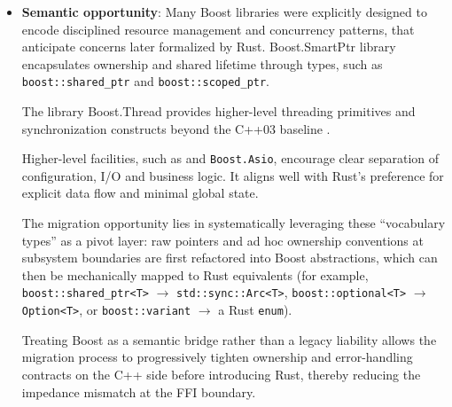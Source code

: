 \begin{itemize}
\begin{lstlisting}[language=C++]
        class AsyncEngine {
        public:
            AsyncEngine() : timer_(io_, boost::asio::chrono::milliseconds(500)) {}

            // PROBLEM: This method uses a C++ Template for the handler (Lambda).
            // Bindgen ignores this because it requires template instantiation.
            // It relies on SFINAE to check if the handler has the right signature.
            template <typename CompletionToken>
            void start_task(CompletionToken&& token) {
                timer_.async_wait(token);
                io_.run();
            }

        private:
            boost::asio::io_context io_;
            boost::asio::steady_timer timer_;
        };
    \end{lstlisting}

    \item \textbf{Semantic opportunity}: Many Boost libraries were explicitly designed to encode disciplined 
    resource management 
    and concurrency patterns, that anticipate concerns later formalized by Rust. 
    Boost.SmartPtr library encapsulates ownership and shared lifetime through types, such as 
    \texttt{boost::shared\_ptr} and \texttt{boost::scoped\_ptr}. 
    
    The library Boost.Thread provides higher-level threading primitives 
    and synchronization constructs beyond the C++03 baseline \parencite{boost_docs}. 

    Higher-level facilities, such as  and \texttt{Boost.Asio}, 
    encourage clear separation of configuration, I/O and business logic. 
    It aligns well with Rust's preference for explicit data flow and minimal global state. 

    The migration opportunity lies in systematically leveraging these ``vocabulary types'' as a pivot layer: 
    raw pointers and ad hoc ownership conventions at subsystem boundaries are first refactored into Boost abstractions, 
    which can then be mechanically mapped to Rust equivalents 
    (for example, \verb|boost::shared_ptr<T>| $\rightarrow$ \verb|std::sync::Arc<T>|,
\verb|boost::optional<T>| $\rightarrow$ \verb|Option<T>|, or
\verb|boost::variant| $\rightarrow$ a Rust \texttt{enum}).

    Treating Boost as a semantic bridge rather than a legacy liability allows the migration process to 
    progressively tighten ownership and error-handling contracts on the C++ side before introducing Rust, 
    thereby reducing the impedance mismatch at the FFI boundary.


\end{itemize}

